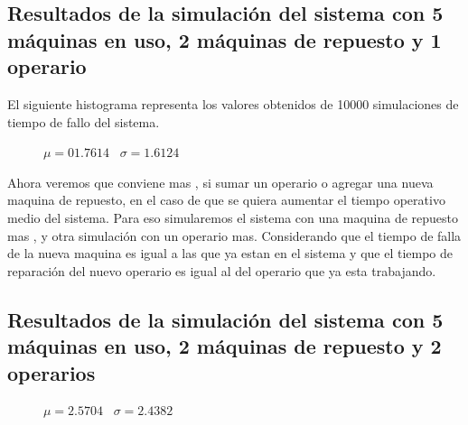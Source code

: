 \documentclass[12pt]{article}
\begin{document}
\subsection{Resultados de la  simulación del sistema con 5 máquinas en uso, 2 máquinas de repuesto y 1 operario }
El siguiente histograma representa los valores obtenidos de 10000 simulaciones de tiempo de fallo del sistema. 

\begin{figure}[hbt]
\noindent{}
\centerline{$\mu= 01.7614$  \  $\sigma =1.6124$}
\end{figure}

Ahora veremos que conviene mas , si sumar un operario o agregar una nueva maquina de repuesto, en el caso de que se quiera aumentar el tiempo operativo medio del sistema. Para eso simularemos el sistema  con una maquina de repuesto mas , y  otra simulación con un operario mas. Considerando que  el tiempo de falla de la nueva maquina es igual a las que ya estan en el sistema y que el tiempo de reparación del nuevo operario es igual al del operario que ya esta trabajando.

\pagebreak

\subsection{Resultados de la simulación del sistema con 5 máquinas en uso, 2 máquinas de repuesto y 2 operarios}

\begin{figure}[hbt]
\noindent{}
\centerline{$\mu= 2.5704$  \  $\sigma =2.4382$}

\end{figure}
\end{document}
